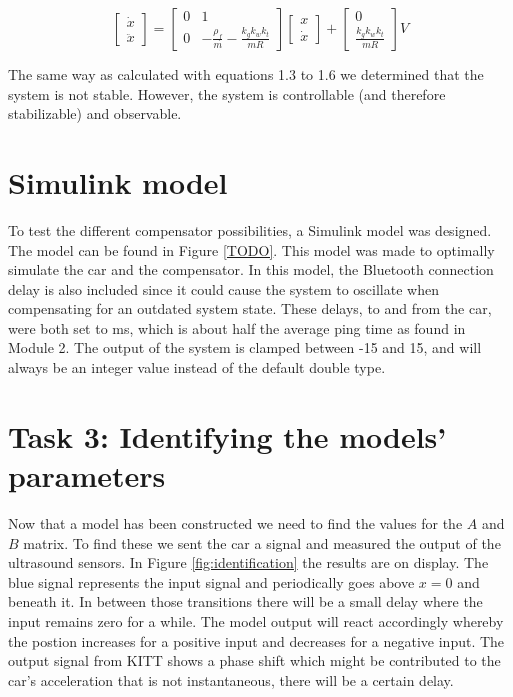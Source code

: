 \documentclass[final]{scrreprt} %
\begin{document}
\begin{equation}
	\begin{bmatrix}
		\dot{x} \\
		\ddot{x}
	\end{bmatrix} =
	\begin{bmatrix}
		0 & 1 \\
		0 & -\frac{\rho_f}{m} - \frac{k_g k_w k_t}{mR}
	\end{bmatrix}
	\begin{bmatrix}
		x \\
		\dot{x}
	\end{bmatrix} +
	\begin{bmatrix}
		0 \\
		\frac{k_g k_w k_t}{mR}
	\end{bmatrix}
	V
	\label{eq:total_system_matrix}
\end{equation}

The same way as calculated with equations 1.3 to 1.6 we determined that the system is not stable.
However, the system is controllable (and therefore stabilizable) and observable.

\section*{Simulink model}
To test the different compensator possibilities, a Simulink model was designed.
The model can be found in Figure \ref{TODO}.
This model was made to optimally simulate the car and the compensator.
In this model, the Bluetooth connection delay is also included since it could cause the system to oscillate when compensating for an outdated system state.
These delays, to and from the car, were both set to \unit[50]{ms}, which is about half the average ping time as found in Module 2.
The output of the system is clamped between -15 and 15, and will always be an integer value instead of the default double type.

\section*{Task 3: Identifying the models' parameters}
Now that a model has been constructed we need to find the values for the $A$ and $B$ matrix.
To find these we sent the car a signal and measured the output of the ultrasound sensors.
In Figure \ref{fig:identification} the results are on display.
The blue signal represents the input signal and periodically goes above $x=0$ and beneath it.
In between those transitions there will be a small delay where the input remains zero for a while.
The model output will react accordingly whereby the postion increases for a positive input and decreases for a negative input.
The output signal from KITT shows a phase shift which might be contributed to the car's acceleration that is not instantaneous, there will be a certain delay.
\end{document}
